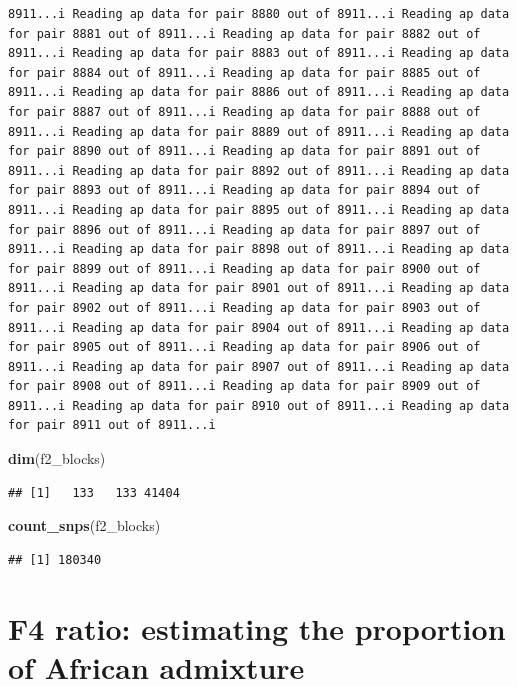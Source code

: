 \documentclass[
]{article}
\newenvironment{Shaded}{\begin{snugshade}}{\end{snugshade}}
\newcommand{\FunctionTok}[1]{\textcolor[rgb]{0.13,0.29,0.53}{\textbf{#1}}}
\newcommand{\NormalTok}[1]{#1}
\begin{document}
\begin{verbatim}
8911...i Reading ap data for pair 8880 out of 8911...i Reading ap data for pair 8881 out of 8911...i Reading ap data for pair 8882 out of 8911...i Reading ap data for pair 8883 out of 8911...i Reading ap data for pair 8884 out of 8911...i Reading ap data for pair 8885 out of 8911...i Reading ap data for pair 8886 out of 8911...i Reading ap data for pair 8887 out of 8911...i Reading ap data for pair 8888 out of 8911...i Reading ap data for pair 8889 out of 8911...i Reading ap data for pair 8890 out of 8911...i Reading ap data for pair 8891 out of 8911...i Reading ap data for pair 8892 out of 8911...i Reading ap data for pair 8893 out of 8911...i Reading ap data for pair 8894 out of 8911...i Reading ap data for pair 8895 out of 8911...i Reading ap data for pair 8896 out of 8911...i Reading ap data for pair 8897 out of 8911...i Reading ap data for pair 8898 out of 8911...i Reading ap data for pair 8899 out of 8911...i Reading ap data for pair 8900 out of 8911...i Reading ap data for pair 8901 out of 8911...i Reading ap data for pair 8902 out of 8911...i Reading ap data for pair 8903 out of 8911...i Reading ap data for pair 8904 out of 8911...i Reading ap data for pair 8905 out of 8911...i Reading ap data for pair 8906 out of 8911...i Reading ap data for pair 8907 out of 8911...i Reading ap data for pair 8908 out of 8911...i Reading ap data for pair 8909 out of 8911...i Reading ap data for pair 8910 out of 8911...i Reading ap data for pair 8911 out of 8911...i
\end{verbatim}

\begin{Shaded}
\begin{Highlighting}[]
\FunctionTok{dim}\NormalTok{(f2\_blocks)}
\end{Highlighting}
\end{Shaded}

\begin{verbatim}
## [1]   133   133 41404
\end{verbatim}

\begin{Shaded}
\begin{Highlighting}[]
\FunctionTok{count\_snps}\NormalTok{(f2\_blocks)}
\end{Highlighting}
\end{Shaded}

\begin{verbatim}
## [1] 180340
\end{verbatim}

\section{F4 ratio: estimating the proportion of African
admixture}\label{f4-ratio-estimating-the-proportion-of-african-admixture}
\end{document}

